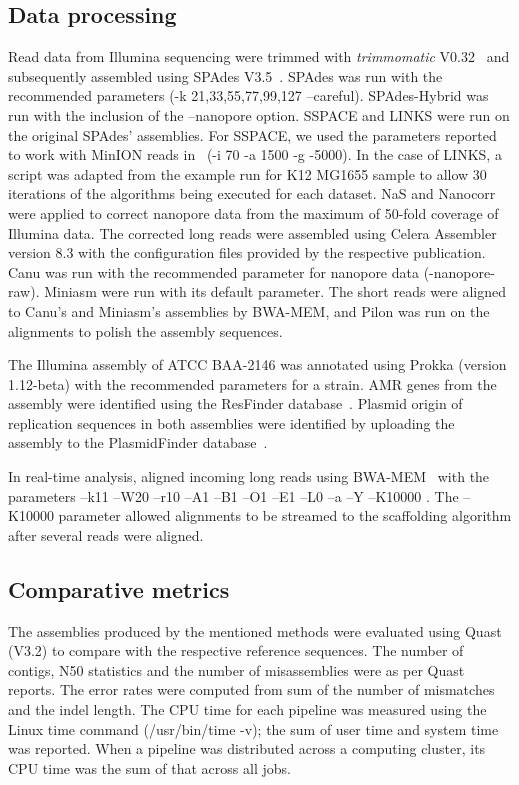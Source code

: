 \subsection{Data processing}
Read data from Illumina sequencing were trimmed with \emph{trimmomatic}
V0.32~\cite{BolgerLU2014} and subsequently assembled using SPAdes
V3.5~\cite{BankevichNA2012}. SPAdes was run with the recommended parameters (-k
21,33,55,77,99,127 --careful). SPAdes-Hybrid was run with the inclusion of the
--nanopore option. SSPACE and LINKS were run on the original SPAdes' assemblies.
For SSPACE, we used the parameters reported to work with MinION reads
in~\cite{KarlssonLS2015} (-i 70 -a 1500 -g -5000). In the case of LINKS, a script
was adapted from the example run for \ec{} K12 MG1655 sample to allow 30
iterations of the algorithms being executed for each dataset. NaS and Nanocorr
were applied to correct nanopore data from the maximum of 50-fold coverage of
Illumina data. The corrected long reads were assembled using Celera Assembler
version 8.3 with the configuration files provided by the respective publication.
Canu was run with the recommended parameter for nanopore data 
(-nanopore-raw). Miniasm were run with its default parameter. The short reads 
were aligned to Canu's and Miniasm's assemblies by BWA-MEM, and Pilon was run on 
the alignments to polish the assembly sequences.


The Illumina assembly of \kp{} ATCC BAA-2146 was annotated using 
Prokka (version 1.12-beta) with the recommended parameters for a \kp{} strain.
AMR genes from the assembly were identified using the ResFinder 
database~\cite{ZankariHC2012}.
Plasmid origin of replication sequences in both \kp{} assemblies were identified 
by uploading the assembly to the PlasmidFinder database~\cite{CarattoliZG2014}.


In real-time analysis, \npscarf{} aligned incoming long
reads using BWA-MEM~\cite{Li2013} with the parameters --k11 --W20 --r10
--A1 --B1 --O1 --E1 --L0 --a --Y --K10000 . The --K10000 parameter allowed 
alignments to be streamed to the scaffolding algorithm after several reads 
were aligned. 

\subsection{Comparative metrics}
The assemblies produced by the mentioned methods were evaluated using Quast
(V3.2) to compare with the respective reference sequences. The number of contigs,
N50 statistics and the number of misassemblies were as per Quast reports.
The error rates were computed from sum of the number of mismatches and the indel
length. The CPU time for each pipeline was measured using the Linux time command 
(/usr/bin/time -v); the sum of user time and system time was reported. 
When a pipeline was distributed across a computing cluster, its CPU time was the
sum of that across all jobs.

